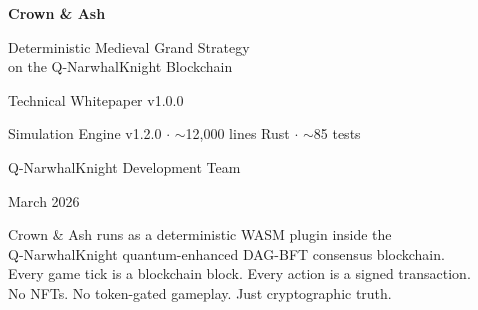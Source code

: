 \documentclass[a4paper, 11pt]{article}
\newcommand{\docversion}{1.0.0}
\newcommand{\simversion}{1.2.0}
\newcommand{\linecount}{$\sim$12{,}000}
\newcommand{\testcount}{$\sim$85}
\begin{document}
\begin{titlepage}
\begin{center}
\vspace*{2cm}

{\Huge\bfseries\textcolor{cashdark}{Crown \& Ash}}

\vspace{0.4cm}
{\Large\textcolor{cashcopper}{Deterministic Medieval Grand Strategy\\on the Q-NarwhalKnight Blockchain}}

\vspace{1.5cm}


\vspace{1.5cm}

{\large Technical Whitepaper v\docversion}

\vspace{0.3cm}
{\normalsize Simulation Engine v\simversion{} $\cdot$ \linecount{} lines Rust $\cdot$ \testcount{} tests}

\vspace{1cm}

{\normalsize Q-NarwhalKnight Development Team}

\vspace{0.3cm}
{\small March 2026}

\vspace{\fill}

{\footnotesize
  \textcolor{cashiron}{
    Crown \& Ash runs as a deterministic WASM plugin inside the\\
    Q-NarwhalKnight quantum-enhanced DAG-BFT consensus blockchain.\\
    Every game tick is a blockchain block. Every action is a signed transaction.\\
    No NFTs. No token-gated gameplay. Just cryptographic truth.
  }
}
\end{center}
\end{titlepage}
\end{document}

